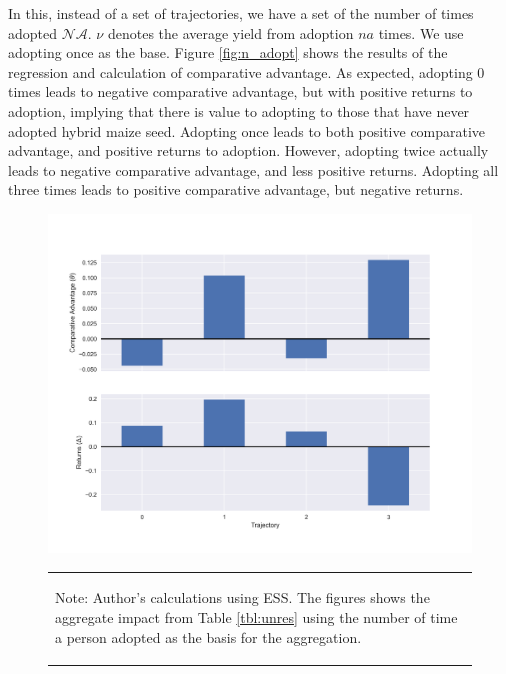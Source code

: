 \documentclass[11pt]{article}
\begin{document}
In this, instead of a set of trajectories, we have a set of the number of times adopted $\mathcal{NA}$. $\nu$ denotes the average yield from adoption $na$ times. We use adopting once as the base. Figure \ref{fig:n_adopt} shows the results of the regression and calculation of comparative advantage. As expected, adopting 0 times leads to negative comparative advantage, but with positive returns to adoption, implying that there is value to adopting to those that have never adopted hybrid maize seed. Adopting once leads to both positive comparative advantage, and positive returns to adoption. However, adopting twice actually leads to negative comparative advantage, and less positive returns. Adopting all three times leads to positive comparative advantage, but negative returns.

\begin{figure}
    \centering
    \caption{Aggregation Results: Comparative Advantage and Returns by the Number of Times Adopted (Dry Cropcuts)}
    \label{fig:n_adopt}
    \includegraphics[scale=0.75]{results/figures/num_adoption.png}
    \vspace*{-2em}
    \begin{table}[H]
        \centering
        \begin{tabular}{p{}} 
            \begin{tablenotes}
                  \small
                  \item Note: Author's calculations using ESS. The figures shows the aggregate impact from Table \ref{tbl:unres} using the number of time a person adopted as the basis for the aggregation.
            \end{tablenotes}
        \end{tabular}
    \end{table}
\end{figure}
\end{document}

